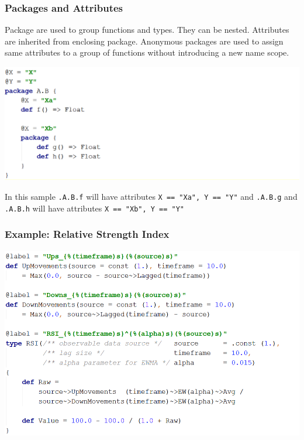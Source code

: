 \documentclass{beamer}
\begin{document}
\begin{frame}
\frametitle{Packages and Attributes}
Package are used to group functions and types. They can be nested. Attributes are inherited from enclosing package. Anonymous packages are used to assign same attributes to a group of functions without introducing a new name scope.

\includegraphics[width=1\linewidth]{packages.png}

In this sample \texttt{.A.B.f} will have attributes \texttt{X == "Xa", Y == "Y"} and \texttt{.A.B.g} and \texttt{.A.B.h} will have attributes \texttt{X == "Xb", Y == "Y"}

\end{frame}
\begin{frame}
\frametitle{Example: Relative Strength Index}
\includegraphics[width=1\linewidth]{rsi.png}
\end{frame}
\end{document}
